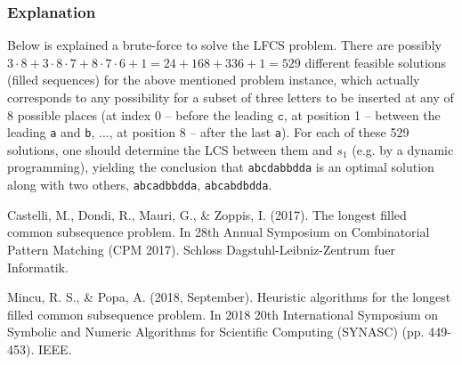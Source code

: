 \documentclass[]{article}
\begin{document}

\subsubsection{Explanation}

Below is explained a brute-force to solve the LFCS problem. There are possibly $ 3 \cdot 8  + 3 \cdot 8 \cdot 7 + 8 \cdot 7 \cdot 6 + 1= 24 + 168 +336+1 =529$ different feasible solutions (filled sequences) for the above mentioned problem instance, which actually corresponds to any possibility for a subset of three letters to be inserted  at any of 8 possible places (at index 0 -- before the leading $\texttt{c}$, at position 1 -- between the leading \texttt{a} and \texttt{b}, $\ldots$, at position 8 -- after the last \texttt{a}). For each of these 529 solutions, one should determine the LCS between them and $s_1$ (e.g. by a dynamic programming), yielding the conclusion that  \texttt{abcdabbdda} is an optimal solution along with two others, \texttt{abcadbbdda}, \texttt{abcabdbdda}. 






\begin{thebibliography}{9}
		Castelli, M., Dondi, R., Mauri, G., \& Zoppis, I. (2017). The longest filled common subsequence problem. In 28th Annual Symposium on Combinatorial Pattern Matching (CPM 2017). Schloss Dagstuhl-Leibniz-Zentrum fuer Informatik.
	
	    Mincu, R. S., \& Popa, A. (2018, September). Heuristic algorithms for the longest filled common subsequence problem. In 2018 20th International Symposium on Symbolic and Numeric Algorithms for Scientific Computing (SYNASC) (pp. 449-453). IEEE.
\end{thebibliography}
\end{document}
